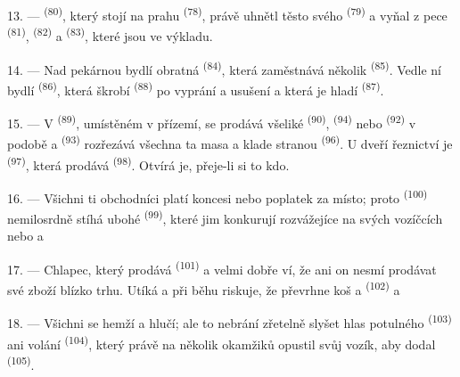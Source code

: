 13. ---  \textsuperscript{(80)}, který stojí na prahu 
\textsuperscript{(78)}, právě uhnětl těsto svého  \textsuperscript{(79)} a
vyňal z pece  \textsuperscript{(81)},  \textsuperscript{(82)} a
 \textsuperscript{(83)}, které jsou ve výkladu.

14. --- Nad pekárnou bydlí obratná  \textsuperscript{(84)}, která
zaměstnává několik  \textsuperscript{(85)}. Vedle ní bydlí
 \textsuperscript{(86)}, která škrobí 
\textsuperscript{(88)} po vyprání a usušení a která je hladí 
\textsuperscript{(87)}.

\VUsaut{4.0mm}
\VUsaut{3.0mm}

15. --- V  \textsuperscript{(89)}, umístěném v přízemí, se prodává všeliké
 \textsuperscript{(90)},  \textsuperscript{(94)} nebo
 \textsuperscript{(92)} v podobě
 a  
\textsuperscript{(93)} rozřezává všechna ta masa a klade stranou 
\textsuperscript{(96)}. U dveří řeznictví je 
\textsuperscript{(97)}, která prodává  \textsuperscript{(98)}. Otvírá je,
přeje-li si to kdo.

16. --- Všichni ti obchodníci platí koncesi nebo poplatek za místo; proto
 \textsuperscript{(100)} nemilosrdně stíhá ubohé  \textsuperscript{(99)}, které jim konkurují rozvážejíce na svých
vozíčcích  nebo
 a 

\VUsaut{4.0mm}
\VUsaut{3.0mm}

17. --- Chlapec, který prodává  \textsuperscript{(101)} a
 velmi dobře ví, že ani on nesmí prodávat své zboží blízko trhu. Utíká
a při běhu riskuje, že převrhne koš   a 
 \textsuperscript{(102)}  a 

18. --- Všichni se hemží a hlučí; ale to nebrání zřetelně slyšet hlas potulného
 \textsuperscript{(103)} ani volání 
\textsuperscript{(104)}, který právě na několik okamžiků opustil svůj vozík, aby dodal
 \textsuperscript{(105)}.
